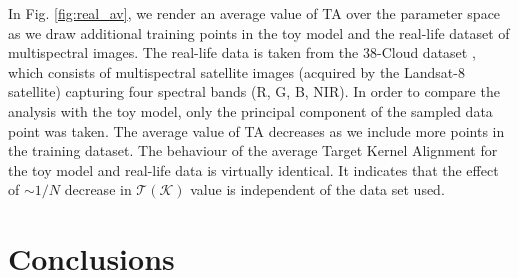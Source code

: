 \documentclass{article}
\begin{document}
In Fig. \ref{fig:real_av}, we render an average value of TA over the parameter space as we draw additional training points in the toy model and the real-life dataset of multispectral images. The real-life data is taken from the 38-Cloud dataset \cite{38-cloud-1, 38-cloud-2}, which consists of multispectral satellite images (acquired by the Landsat-8 satellite) capturing four spectral bands (R, G, B, NIR). In order to compare the analysis with the toy model, only the principal component of the sampled data point was taken. The average value of TA decreases as we include more points in the training dataset. 
The behaviour of the average Target Kernel Alignment for the toy model and real-life data is virtually identical. It indicates that the effect of $\sim 1/N$ decrease in $\mathcal{T}(\mathcal{K})$ value is independent of the data set used. %








\section{Conclusions}
\end{document}
